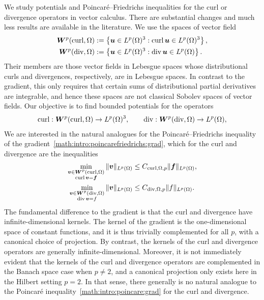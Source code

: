 \documentclass[10pt,a4paper]{article}
\begin{document}
We study potentials and Poincar\'e--Friedrichs inequalities for the curl or divergence operators in vector calculus.
There are substantial changes and much less results are available in the literature. 
We use the spaces of vector field 
\begin{align}
    \bm{W}^{p}(\operatorname{curl},\Omega) &:= \left\{ \bm{u} \in L^{p}(\Omega)^{3} : \operatorname{curl} \bm{u} \in L^{p}(\Omega)^{3} \right\}
    \label{math:intro:Wcurl}
    ,
    \\
    \bm{W}^{p}(\operatorname{div},\Omega) &:= \left\{ \bm{u} \in L^{p}(\Omega)^{3} : \operatorname{div} \bm{u} \in L^{p}(\Omega) \right\}
    \label{math:intro:Wdiv}
    .
\end{align}
Their members are those vector fields in Lebesgue spaces whose distributional curls and divergences, respectively, are in Lebesgue spaces. 
In contrast to the gradient, this only requires that certain sums of distributional partial derivatives are integrable, 
and hence these spaces are not classical Sobolev spaces of vector fields. 
Our objective is to find bounded potentials for the operators 
\begin{align*}
    \operatorname{curl} : \bm{W}^{p}(\operatorname{curl},\Omega) \rightarrow L^{p}(\Omega)^{3},
    \qquad 
    \operatorname{div} : \bm{W}^{p}(\operatorname{div},\Omega) \rightarrow L^{p}(\Omega),
\end{align*}
We are interested in the natural analogues for the Poincar\'e--Friedrichs inequality of the gradient~\eqref{math:intro:poincarefriedrichs:grad},
which for the curl and divergence are the inequalities 
\begin{align}
    \min\limits_{ \substack{ \bfv \in \bfW^{p}(\curl,\Omega) \\ \curl \bfv = \bff } } 
    \| \bfv \|_{L^{p}(\Omega)}
    &\leq 
    C_{\curl,\Omega,p}
    \| \bff \|_{L^{p}(\Omega)}
    \label{math:intro:Wcurl:pf}
    ,
    \\%
    \min\limits_{ \substack{ \bfv \in \bfW^{p}(\divergence,\Omega) \\ \divergence \bfv = f } } 
    \| \bfv \|_{L^{p}(\Omega)}
    &\leq 
    C_{\divergence,\Omega,p}
    \| f \|_{L^{p}(\Omega)}
    \label{math:intro:Wdiv:pf}
    .
\end{align}
The fundamental difference to the gradient is that the curl and divergence have infinite-dimensional kernels. 
The kernel of the gradient is the one-dimensional space of constant functions, and it is thus trivially complemented for all $p$, with a canonical choice of projection. 
By contrast, the kernels of the curl and divergence operators are generally infinite-dimensional. 
Moreover, it is not immediately evident that the kernels of the curl and divergence operators are complemented in the Banach space case when $p \neq 2$, 
and a canonical projection only exists here in the Hilbert setting $p=2$. 
In that sense, there generally is no natural analogue to the Poincar\'e inequality~\eqref{math:intro:poincare:grad} for the curl and divergence. 
\end{document}
